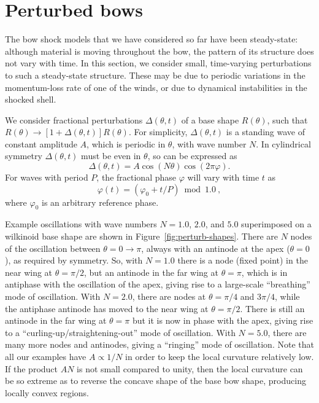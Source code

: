 \section{Perturbed bows}
\label{sec:perturbed-bows}

The bow shock models that we have considered so far have been
steady-state: although material is moving throughout the bow, the
pattern of its structure does not vary with time.  In this section, we
consider small, time-varying perturbations to such a steady-state
structure.  These may be due to periodic variations in the
momentum-loss rate of one of the winds, or due to dynamical
instabilities in the shocked shell.

We consider fractional perturbations \(\Delta(\theta, t)\) of a base shape
\(R(\theta)\), such that
\(R(\theta) \to [1 + \Delta(\theta, t)] R(\theta)\).  For simplicity,
\(\Delta(\theta, t)\) is a standing wave of constant amplitude \(A\), which is
periodic in \(\theta\), with wave number \(N\).  In cylindrical symmetry
\(\Delta(\theta, t)\) must be even in \(\theta\), so can be expressed as
\begin{equation}
  \label{eq:standing-wave}
  \Delta(\theta, t) = A \cos(N \theta) \cos(2\pi \varphi) . 
\end{equation}
For waves with period \(P\), the fractional phase \(\varphi\) will
vary with time \(t\) as
\begin{equation}
  \label{eq:fractional-phase}
  \varphi(t) = (\varphi_0 + t/P) \bmod 1.0\ ,
\end{equation}
where \(\varphi_0\) is an arbitrary reference phase.

Example oscillations with wave numbers \(N = 1.0\), \(2.0\), and
\(5.0\) superimposed on a wilkinoid base shape are shown in
Figure~\ref{fig:perturb-shapes}.  There are \(N\) nodes of the
oscillation between \(\theta = 0 \to \pi\), always with an antinode at the apex
(\(\theta = 0\)), as required by symmetry.  So, with \(N = 1.0\) there is a
node (fixed point) in the near wing at \(\theta = \pi/2\), but an antinode in
the far wing at \(\theta = \pi\), which is in antiphase with the oscillation
of the apex, giving rise to a large-scale ``breathing'' mode of
oscillation.  With \(N = 2.0\), there are nodes at \(\theta = \pi/4\) and
\(3\pi/4\), while the antiphase antinode has moved to the near wing at
\(\theta = \pi/2\).  There is still an antinode in the far wing at
\(\theta = \pi\) but it is now in phase with the apex, giving rise to a
``curling-up/straightening-out'' mode of oscillation.  With
\(N = 5.0\), there are many more nodes and antinodes, giving a
``ringing'' mode of oscillation.  Note that all our examples have
\(A \propto 1/N\) in order to keep the local curvature relatively low.  If
the product \(A N\) is not small compared to unity, then the local
curvature can be so extreme as to reverse the concave shape of the
base bow shape, producing locally convex regions.



